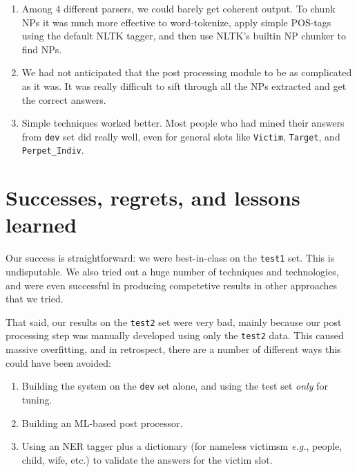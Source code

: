 \documentclass[11pt]{myclass}
\begin{document}
\begin{enumerate}

\item Among 4 different parsers, we could barely get coherent output. To chunk NPs it was much more effective to word-tokenize, apply simple POS-tags using the default NLTK tagger, and then use NLTK's builtin NP chunker to find NPs.

\item We had not anticipated that the post processing module to be as complicated as it was. It was really difficult to sift through all the NPs extracted and get the correct answers.

\item Simple techniques worked better. Most people who had mined their answers from \texttt{dev} set did really well, even for general slots like \texttt{Victim}, \texttt{Target}, and \texttt{Perpet\_Indiv}.

\end{enumerate}

\section{Successes, regrets, and lessons learned}

Our success is straightforward: we were best-in-class on the \texttt{test1} set. This is undisputable. We also tried out a huge number of techniques and technologies, and were even successful in producing competetive results in other approaches that we tried.

That said, our results on the \texttt{test2} set were very bad, mainly because our post processing step was manually developed using only the \texttt{test2} data. This caused massive overfitting, and in retrospect, there are a number of different ways this could have been avoided:

\begin{enumerate}

\item Building the system on the \texttt{dev} set alone, and using the test set \textit{only} for tuning.
\item Building an ML-based post processor.
\item Using an NER tagger plus a dictionary (for nameless victimsm \textit{e.g.}, people, child, wife, etc.) to validate the answers for the victim slot.

\end{enumerate}
\end{document}
